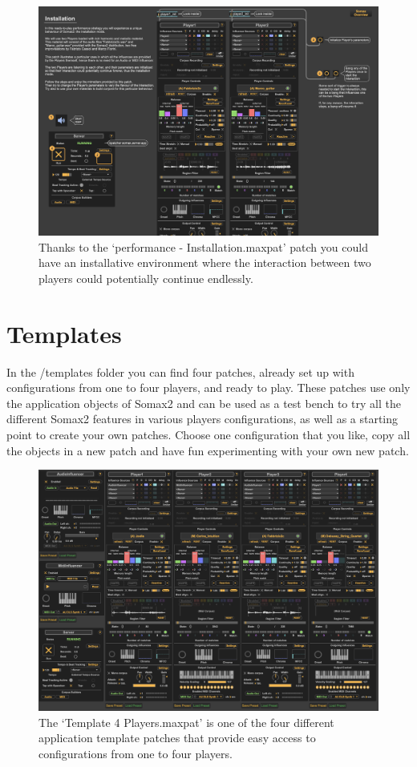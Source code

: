 \begin{figure}[H]
    \centering        
 	\includegraphics[width=1\textwidth]{img/installation.png}
    \caption{Thanks to the `performance - Installation.maxpat' patch you could have an installative environment where the interaction between two players could potentially continue endlessly.}
    \label{fig:installation}
\end{figure}


\section{Templates}
In the /templates folder you can find four patches, already set up with configurations from one to four players, and ready to play. These patches use only the application objects of Somax2 and can be used as a test bench to try all the different Somax2 features in various players configurations, as well as a starting point to create your own patches. Choose one configuration that you like, copy all the objects in a new patch and have fun experimenting with your own new patch.

 \begin{figure}[H]
    \centering        
 	\includegraphics[width=1\textwidth]{img/templates.png}
    \caption{The `Template 4 Players.maxpat' is one of the four different application template patches that provide easy access to configurations from one to four players.}
    \label{fig:templates}
\end{figure}


